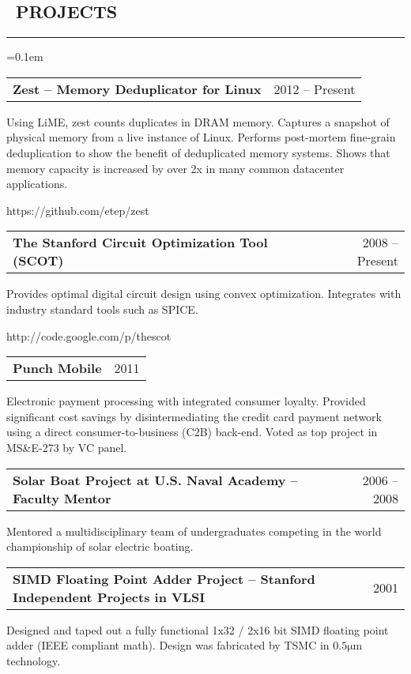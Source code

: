 \documentclass[10pt,letterpaper]{article}
\makeatletter
\newenvironment{changemargin}[2]
{%
    \begin{list}{}{%
        \setlength{\topsep}{0pt}%
        \setlength{\leftmargin}{#1}%
        \setlength{\rightmargin}{#2}%
        \setlength{\listparindent}{\parindent}%
        \setlength{\itemindent}{\parindent}%
        \setlength{\parsep}{\parskip}%
    }%
    \item[]
}%
{%
    \end{list}
}%
\newenvironment{content}
{%
    \begin{changemargin}{0cm}{2.5cm}
    \begin{itemize*}
        \vspace{-0.15em}
}%
{%
    \end{itemize*}
    \end{changemargin}
}%
\newenvironment{resumesection}[1]
{%
    \subsection*{\ #1}
    \vspace{-0.4em}
    \hrule
    \vspace{+0.4em}
    \begin{itemize}
        \parskip=0.1em
}%
{%
    \end{itemize}
}%
\newcommand{\headerrowx}[2]
{\item[] \begin{tabular*}{\linewidth}{l@{\extracolsep{\fill}}r}
	#1 &
	#2 \\
\end{tabular*}}
\makeatother
\begin{document}
\begin{resumesection}{PROJECTS}
    \headerrowx{ \textbf{Zest -- Memory Deduplicator for Linux}} {2012 -- Present}
    \begin{content}
        \item[] Using LiME, zest counts duplicates in DRAM memory.
                Captures a snapshot of physical memory from a live instance of Linux.
                Performs post-mortem fine-grain deduplication to show the benefit of deduplicated memory systems.
                Shows that memory capacity is increased by over 2x in many common datacenter applications.
        \item[] https://github.com/etep/zest
    \end{content}
    \headerrowx{ \textbf{The Stanford Circuit Optimization Tool (SCOT)}} {2008 -- Present}
    \begin{content}
        \item[] Provides optimal digital circuit design using convex optimization.
                Integrates with industry standard tools such as SPICE.
        \item[] http://code.google.com/p/thescot
    \end{content}
    \headerrowx{ \textbf{Punch Mobile}} {2011}
    \begin{content}
        \item[] Electronic payment processing with integrated consumer loyalty.
                Provided significant cost savings by disintermediating the credit card payment network using a direct consumer-to-business (C2B) back-end.
                Voted as top project in MS\&E-273 by VC panel.
    \end{content}
    \headerrowx{ \textbf{Solar Boat Project at U.S. Naval Academy -- Faculty Mentor}} {2006 -- 2008}
    \begin{content}
        \item[] Mentored a multidisciplinary team of undergraduates competing in the world championship of solar electric boating.
    \end{content}
    \headerrowx{ \textbf{SIMD Floating Point Adder Project -- Stanford Independent Projects in VLSI}} {2001}
    \begin{content}
        \item[] Designed and taped out a fully functional 1x32 / 2x16 bit SIMD floating point adder (IEEE compliant math).
                Design was fabricated by TSMC in $\mathrm{0.5 \mu m}$ technology.
    \end{content}
\end{resumesection}
\end{document}
